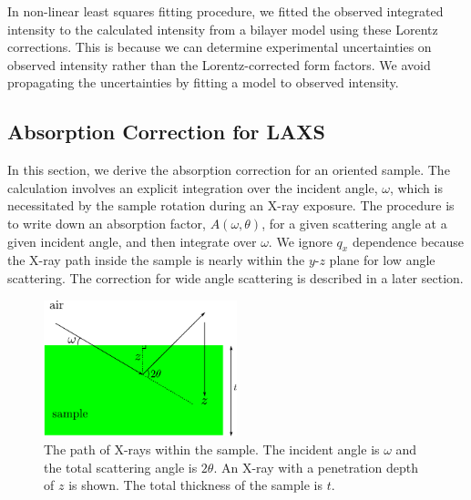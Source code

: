 In non-linear least squares fitting procedure, 
we fitted the observed integrated intensity to
the calculated intensity from a bilayer model using these Lorentz corrections. 
This is because we can determine experimental uncertainties
on observed intensity rather than the Lorentz-corrected form factors. 
We avoid propagating the uncertainties by fitting a model to observed intensity. 

\subsection{Absorption Correction for LAXS}\label{sec:abs_correction_LAXS}
In this section, we derive the absorption correction for an oriented sample. 
The calculation involves an explicit integration over the incident angle, 
$\omega$, which is necessitated by the sample rotation during an X-ray exposure. 
The procedure is to write down an absorption factor, $A(\omega,\theta)$, for a 
given scattering angle at a given incident angle, and
then integrate over $\omega$. We ignore $q_x$ dependence because the X-ray
path inside the sample is nearly within the $y$-$z$ plane for low angle
scattering. The correction for wide angle scattering is described in a later
section.

\begin{figure}[htbp]
  \centering
  \includegraphics[width=0.5\textwidth]{figures/ripple/analysis/absorption_LAXS}
  \caption{The path of X-rays within the sample. The incident angle is 
  $\omega$ and the total scattering angle is $2\theta$. An X-ray with a
  penetration depth of $z$ is shown. The total thickness of the sample
  is $t$.}
  \label{fig:absorption_LAXS}
\end{figure}

